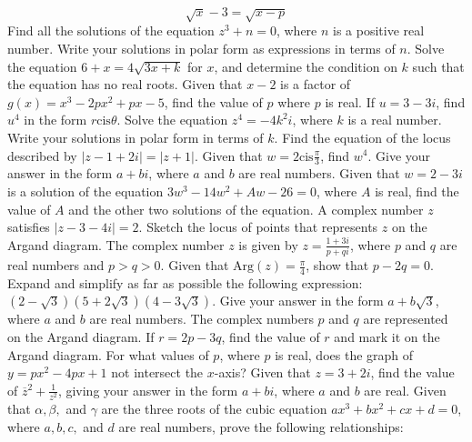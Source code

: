 \documentclass[12pt,addpoints]{exam}
\begin{document}
\begin{questions}
\[
\sqrt{x} - 3 = \sqrt{x - p}
\]
\fillwithlines{3cm}
\question[5] Find all the solutions of the equation \( z^3 + n = 0 \), where \( n \) is a positive real number. Write your solutions in polar form as expressions in terms of \( n \).
\fillwithlines{3cm}
\question[5] Solve the equation \(6 + x = 4\sqrt{3x + k}\) for \(x\), and determine the condition on \(k\) such that the equation has no real roots.
\fillwithlines{3cm}
\question[5] Given that \( x - 2 \) is a factor of \( g(x) = x^3 - 2px^2 + px - 5 \), find the value of \( p \) where \( p \) is real.
\fillwithlines{3cm}
\question[5] If \( u = 3 - 3i \), find \( u^4 \) in the form \( r \text{cis} \theta \).
\fillwithlines{3cm}
\question[5] Solve the equation \( z^4 = -4k^2i \), where \( k \) is a real number. Write your solutions in polar form in terms of \( k \).
\fillwithlines{3cm}
\question[5] Find the equation of the locus described by \( |z - 1 + 2i| = |z + 1| \).
\fillwithlines{3cm}
\question[5] Given that \( w = 2 \text{cis} \frac{\pi}{3} \), find \( w^4 \). Give your answer in the form \( a + bi \), where \( a \) and \( b \) are real numbers.
\fillwithlines{3cm}
\question[5] Given that \( w = 2 - 3i \) is a solution of the equation \( 3w^3 - 14w^2 + Aw - 26 = 0 \), where \( A \) is real, find the value of \( A \) and the other two solutions of the equation.
\fillwithlines{3cm}
\question[5] A complex number \( z \) satisfies \( |z - 3 - 4i| = 2 \). Sketch the locus of points that represents \( z \) on the Argand diagram.
\fillwithlines{3cm}
\question[5] The complex number \( z \) is given by \( z = \frac{1+3i}{p+qi} \), where \( p \) and \( q \) are real numbers and \( p > q > 0 \). Given that \(\text{Arg}(z) = \frac{\pi}{4}\), show that \( p - 2q = 0 \).
\fillwithlines{3cm}
\question[5] Expand and simplify as far as possible the following expression: \((2 - \sqrt{3})(5 + 2\sqrt{3})(4 - 3\sqrt{3})\). Give your answer in the form \( a + b\sqrt{3} \), where \( a \) and \( b \) are real numbers.
\fillwithlines{3cm}
\question[5] The complex numbers \( p \) and \( q \) are represented on the Argand diagram. If \( r = 2p - 3q \), find the value of \( r \) and mark it on the Argand diagram.
\fillwithlines{3cm}
\question[5] For what values of \( p \), where \( p \) is real, does the graph of \( y = px^2 - 4px + 1 \) not intersect the \( x \)-axis?
\fillwithlines{3cm}
\question[5] Given that \( z = 3 + 2i \), find the value of \( \overline{z}^2 + \frac{1}{z^2} \), giving your answer in the form \( a + bi \), where \( a \) and \( b \) are real.
\fillwithlines{3cm}
\question[5] Given that \( \alpha, \beta, \) and \( \gamma \) are the three roots of the cubic equation \( ax^3 + bx^2 + cx + d = 0 \), where \( a, b, c, \) and \( d \) are real numbers, prove the following relationships:


\end{questions}
\end{document}
